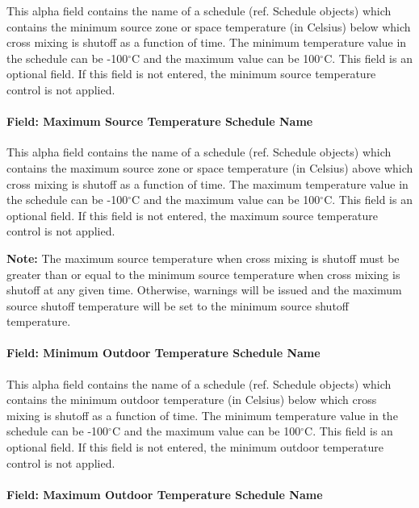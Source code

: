 This alpha field contains the name of a schedule (ref. Schedule objects) which contains the minimum source zone or space temperature (in Celsius) below which cross mixing is shutoff as a function of time. The minimum temperature value in the schedule can be -100$^\circ$C and the maximum value can be 100$^\circ$C. This field is an optional field. If this field is not entered, the minimum source temperature control is not applied.

\paragraph{Field: Maximum Source Temperature Schedule Name}\label{field-maximum-source-zone-temperature-schedule-name-1}

This alpha field contains the name of a schedule (ref. Schedule objects) which contains the maximum source zone or space temperature (in Celsius) above which cross mixing is shutoff as a function of time. The maximum temperature value in the schedule can be -100$^\circ$C and the maximum value can be 100$^\circ$C. This field is an optional field. If this field is not entered, the maximum source temperature control is not applied.

\textbf{Note:} The maximum source temperature when cross mixing is shutoff must be greater than or equal to the minimum source temperature when cross mixing is shutoff at any given time. Otherwise, warnings will be issued and the maximum source shutoff temperature will be set to the minimum source shutoff temperature.

\paragraph{Field: Minimum Outdoor Temperature Schedule Name}\label{field-minimum-outdoor-temperature-schedule-name-3}

This alpha field contains the name of a schedule (ref. Schedule objects) which contains the minimum outdoor temperature (in Celsius) below which cross mixing is shutoff as a function of time. The minimum temperature value in the schedule can be -100$^\circ$C and the maximum value can be 100$^\circ$C. This field is an optional field. If this field is not entered, the minimum outdoor temperature control is not applied.

\paragraph{Field: Maximum Outdoor Temperature Schedule Name}\label{field-maximum-outdoor-temperature-schedule-name-3}

